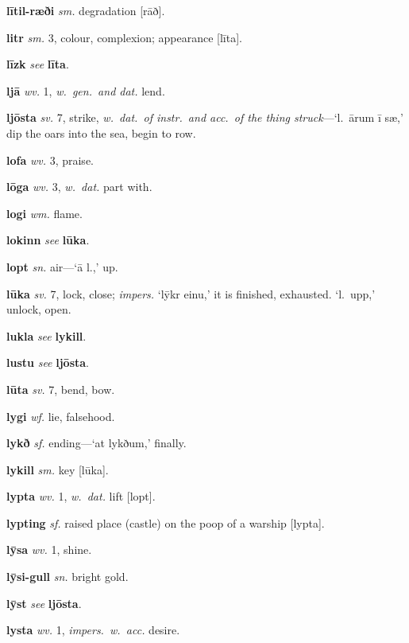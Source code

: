 \documentclass[12pt,letterpaper]{book}
\newcommand\emptypage{\clearpage{\pagestyle{empty}\cleardoublepage}}
\begin{document}
\noindent
\textbf{lītil-ræði} \textit{sm.} degradation [rāð].

\noindent
\textbf{litr} \textit{sm.} 3, colour, complexion; appearance [līta].

\noindent
\textbf{līzk} \textit{} \textit{see} \textbf{līta}.

\noindent
\textbf{ljā} \textit{wv.} 1, \textit{w.\ gen.\ and dat.} lend.

\noindent
\textbf{ljōsta} \textit{sv.} 7, strike, \textit{w.\ dat.\ of instr.\ and acc.\ of
	the thing struck}---`l.\ ārum ī sæ,' dip the oars into the sea,
	begin to row.

\noindent
\textbf{lofa} \textit{wv.} 3, praise.

\noindent
\textbf{lōga} \textit{wv.} 3, \textit{w.\ dat.} part with.

\noindent
\textbf{logi} \textit{wm.} flame.

\noindent
\textbf{lokinn} \textit{} \textit{see} \textbf{lūka}.

\noindent
\textbf{lopt} \textit{sn.} air---`ā l.,' up.

\noindent
\textbf{lūka} \textit{sv.} 7, lock, close; \textit{impers.} `lȳkr einu,'
	it is finished, exhausted.  `l.\ upp,' unlock, open.

\noindent
\textbf{lukla} \textit{} \textit{see} \textbf{lykill}.

\noindent
\textbf{lustu} \textit{} \textit{see} \textbf{ljōsta}.

\noindent
\textbf{lūta} \textit{sv.} 7, bend, bow.

\noindent
\textbf{lygi} \textit{wf.} lie, falsehood.

\noindent
\textbf{lykð} \textit{sf.} ending---`at lykðum,' finally.

\noindent
\textbf{lykill} \textit{sm.} key [lūka].

\noindent
\textbf{lypta} \textit{wv.} 1, \textit{w.\ dat.} lift [lopt].

\noindent
\textbf{lypting} \textit{sf.} raised place (castle) on the poop of a warship
    [lypta].

\noindent
\textbf{lȳsa} \textit{wv.} 1, shine.

\noindent
\textbf{lȳsi-gull} \textit{sn.} bright gold.

\noindent
\textbf{lȳst} \textit{} \textit{see} \textbf{ljōsta}.

\noindent
\textbf{lysta} \textit{wv.} 1, \textit{impers.\ w.\ acc.} desire.

\emptypage
\end{document}
